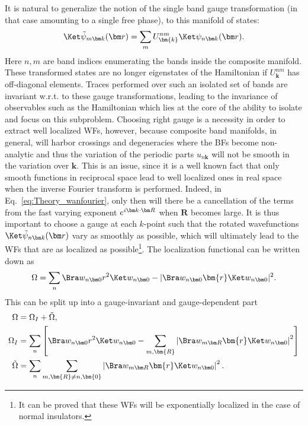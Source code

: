 It is natural to generalize the notion of the single band gauge transformation (in that case amounting to a single free phase), to this manifold of states:
\begin{equation}
	\tildeBlochKet{m} = \sum_m U^{nm}_{\bm{k}} \BlochKet{n}.
\end{equation}
Here $n,m$ are band indices enumerating the bands inside the composite manifold.
These transformed states are no longer eigenstates of the Hamiltonian if $U^{nm}_{\bm{k}}$ has off-diagonal elements.
Traces performed over such an isolated set of bands are invariant w.r.t. to these gauge transformations, leading to the invariance of observables such as the Hamiltonian which lies at the core of the ability to isolate and focus on this subproblem.
Choosing right gauge is a necessity in order to extract well localized WFs, however, because composite band manifolds, in general, will harbor crossings and degeneracies where the BFs become non-analytic and thus the variation of the periodic parts $u_{n\bm{k}}$ will not be smooth in the variation over $\bm{k}$.
This is an issue, since it is a well known fact that only smooth functions in reciprocal space lead to well localized ones in real space when the inverse Fourier transform is performed.
Indeed, in Eq.~\ref{eq:Theory_wanfourier}, only then will there be a cancellation of the terms from the fast varying exponent $\eikr{R}$ when $\bm{R}$ becomes large.
It is thus important to choose a gauge at each $k$-point such that the rotated wavefunctions $\tildeBlochKet{n}$ vary as smoothly as possible, which will ultimately lead to the WFs that are as localized as possible\footnote{It can be proved that these WFs will be exponentially localized in the case of normal insulators.}. 
The localization functional can be written down as
\begin{equation}
	\Omega =\sum_n \ShortWanBra{n}{0}r^2\ShortWanKet{n}{0} - |\ShortWanBra{n}{0}\bm{r}\ShortWanKet{n}{0}|^2.
\end{equation}
This can be split up into a gauge-invariant and gauge-dependent part
\begin{align}
	\Omega &= \Omega_I + \tilde\Omega,  \\
	\Omega_I &= \sum_n \left[\ShortWanBra{n}{0} r^2 \ShortWanKet{n}{0} - \sum_{m,\bm{R}} \left| \ShortWanBra{m}{R} \bm{r} \ShortWanKet{n}{0}\right|^2\right] \label{eq:Theory_omegaI}\\
	\tilde\Omega &= \sum_n \sum_{m,\bm{R} \neq n,\bm{0}} \left|\ShortWanBra{m}{R} \bm{r} \ShortWanKet{n}{0}\right|^2.
\end{align}
